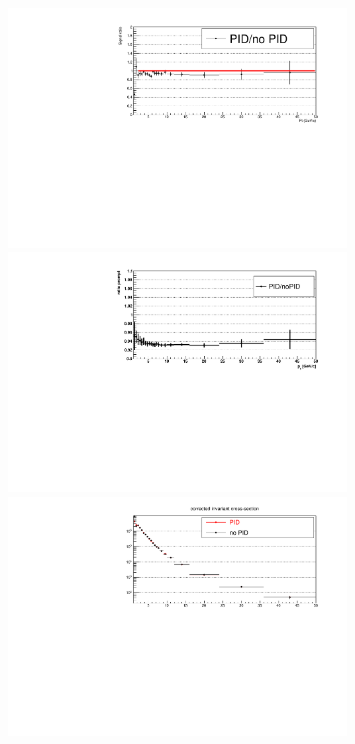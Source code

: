 \begin{figure}[tb]
\begin{center}
\includegraphics[width=0.8\textwidth]{figures/Dstar/pp13TeV/rawyield_ratio_PID_noPID-new.pdf}
 \includegraphics[width=0.8\textwidth]{figures/Dstar/pp13TeV/prompt_PID_noPID_ratio-v3.pdf}
 \includegraphics[width=0.8\textwidth]{figures/Dstar/pp13TeV/cross-section-comaprison-PID-noPID.pdf}

\end{center}
\end{figure}
